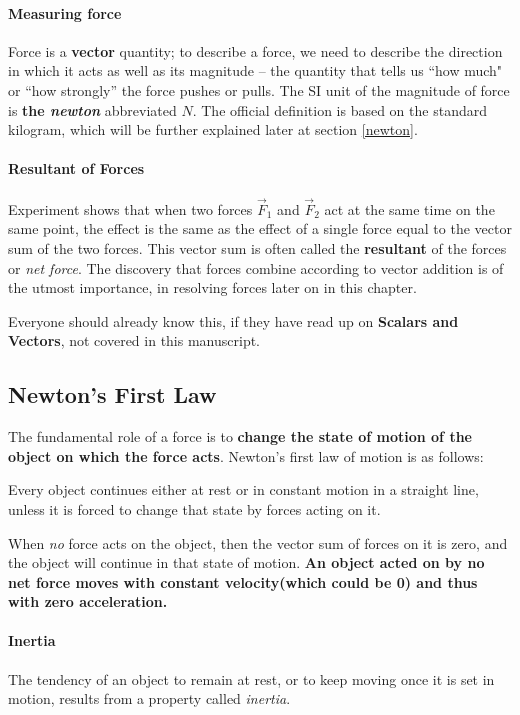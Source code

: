 \paragraph*{Measuring force}
Force is a \textbf{vector} quantity; to describe a force, we need to describe the direction in which it acts as well as its magnitude -- the quantity that tells us ``how much" or ``how strongly'' the force pushes or pulls. The SI unit of the magnitude of force is \textbf{the \emph{newton}} abbreviated $N$. The official definition is based on the standard kilogram, which will be further explained later at section \ref{newton}.

\paragraph*{Resultant of Forces}
Experiment shows that when two forces $\vec{F}_1$ and $\vec{F}_2$ act at the same time on the same point, the effect is the same as the effect of a single force equal to the vector sum of the two forces. This vector sum is often called the \textbf{resultant} of the forces or \emph{net force}. The discovery that forces combine according to vector addition is of the utmost importance, in resolving forces later on in this chapter.

Everyone should already know this, if they have read up on \textbf{Scalars and Vectors}, not covered in this manuscript.

\subsection{Newton's First Law}
The fundamental role of a force is to \textbf{change the state of motion of the object on which the force acts}. Newton's first law of motion is as follows:
\begin{defi}
Every object continues either at rest or in constant motion in a straight line, unless it is forced to change that state by forces acting on it.
\end{defi}

When \emph{no} force acts on the object, then the vector sum of forces on it is zero, and the object will continue in that state of motion. \textbf{An object acted on by no net force moves with constant velocity(which could be 0) and thus with zero acceleration.}

\paragraph{Inertia}
The tendency of an object to remain at rest, or to keep moving once it is set in motion, results from a property called \emph{inertia}. 


